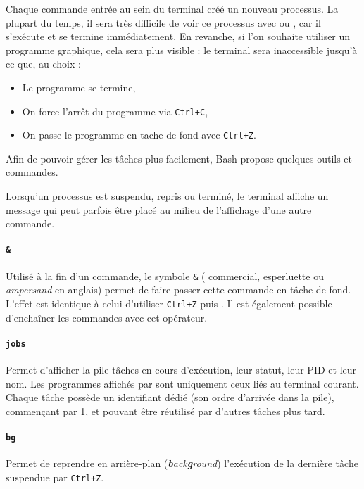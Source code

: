 Chaque commande entrée au sein du terminal créé un nouveau processus. La plupart du temps, il sera très difficile de voir ce processus avec  ou , car il s'exécute et se termine immédiatement. En revanche, si l'on souhaite utiliser un programme graphique, cela sera plus visible : le terminal sera inaccessible jusqu'à ce que, au choix : 
\begin{itemize}
    \item Le programme se termine,
    \item On force l'arrêt du programme via \texttt{Ctrl+C},
    \item On passe le programme en tache de fond avec \texttt{Ctrl+Z}.
\end{itemize}

Afin de pouvoir gérer les tâches plus facilement, Bash propose quelques outils et commandes. 

 Lorsqu'un processus est suspendu, repris ou terminé, le terminal affiche un message qui peut parfois être placé au milieu de l'affichage d'une autre commande.

\paragraph{\texttt{\&}} 
Utilisé à la fin d'un commande, le symbole \texttt{\&} ( commercial, esperluette ou \textit{ampersand} en anglais) permet de faire passer cette commande en tâche de fond. L'effet est identique à celui d'utiliser \texttt{Ctrl+Z} puis . Il est également possible d'enchaîner les commandes avec cet opérateur.


\paragraph{\texttt{jobs}} 
Permet d'afficher la pile tâches en cours d'exécution,  leur statut, leur PID et leur nom. Les programmes affichés par  sont uniquement ceux liés au terminal courant. Chaque tâche possède un identifiant dédié (son ordre d'arrivée dans la pile), commençant par 1, et pouvant être réutilisé par d'autres tâches plus tard.

\paragraph{\texttt{bg}} 
Permet de reprendre en arrière-plan (\textit{\textbf{b}ack\textbf{g}round}) l'exécution de la dernière tâche suspendue par \texttt{Ctrl+Z}.

